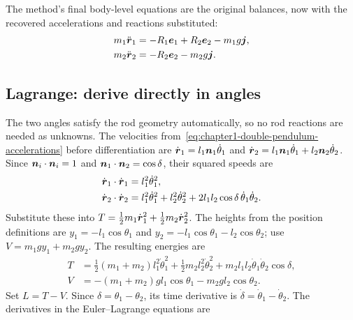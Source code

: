 \documentclass[../main.tex]{subfiles}
\begin{document}
The method's final body-level equations are the original balances, now with the recovered accelerations and reactions substituted:
\begin{equation}
\begin{aligned}
m_1\ddot{\boldsymbol{r}}_1 &= -R_1\boldsymbol{e}_1+R_2\boldsymbol{e}_2-m_1g\boldsymbol{j},\\
m_2\ddot{\boldsymbol{r}}_2 &= -R_2\boldsymbol{e}_2-m_2g\boldsymbol{j}.
\end{aligned}
\label{eq:chapter1-newton-euler-common-form}
\end{equation}

\subsection{Lagrange: derive directly in angles}

The two angles satisfy the rod geometry automatically, so no rod reactions are needed as unknowns. The velocities from~\eqref{eq:chapter1-double-pendulum-accelerations} before differentiation are $\dot{\boldsymbol{r}}_1=l_1\boldsymbol{n}_1\dot\theta_1$ and $\dot{\boldsymbol{r}}_2=l_1\boldsymbol{n}_1\dot\theta_1+l_2\boldsymbol{n}_2\dot\theta_2$. Since $\boldsymbol{n}_i\cdot\boldsymbol{n}_i=1$ and $\boldsymbol{n}_1\cdot\boldsymbol{n}_2=\cos\delta$, their squared speeds are
\begin{equation}
\begin{aligned}
\dot{\boldsymbol{r}}_1\cdot\dot{\boldsymbol{r}}_1 &= l_1^2\dot\theta_1^2,\\
\dot{\boldsymbol{r}}_2\cdot\dot{\boldsymbol{r}}_2 &= l_1^2\dot\theta_1^2+l_2^2\dot\theta_2^2
+2l_1l_2\cos\delta\,\dot\theta_1\dot\theta_2.
\end{aligned}
\label{eq:chapter1-double-pendulum-speed-squares}
\end{equation}
Substitute these into $T=\frac12m_1\dot{\boldsymbol{r}}_1^2+\frac12m_2\dot{\boldsymbol{r}}_2^2$. The heights from the position definitions are $y_1=-l_1\cos\theta_1$ and $y_2=-l_1\cos\theta_1-l_2\cos\theta_2$; use $V=m_1gy_1+m_2gy_2$. The resulting energies are
\begin{equation}
\begin{aligned}
T &= \frac12(m_1+m_2)l_1^2\dot\theta_1^2
+\frac12m_2l_2^2\dot\theta_2^2
+m_2l_1l_2\dot\theta_1\dot\theta_2\cos\delta,\\
V &= -(m_1+m_2)gl_1\cos\theta_1-m_2gl_2\cos\theta_2.
\end{aligned}
\label{eq:chapter1-double-pendulum-energies}
\end{equation}
Set $L=T-V$. Since $\delta=\theta_1-\theta_2$, its time derivative is $\dot\delta=\dot\theta_1-\dot\theta_2$. The derivatives in the Euler--Lagrange equations are
\end{document}
